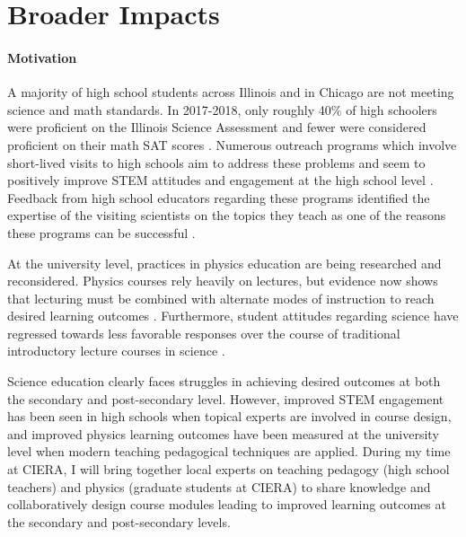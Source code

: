 \documentclass[11pt, preprint]{aastex}
\begin{document}
\vspace{-17pt}
\section{Broader Impacts}
\vspace{-6pt}
\label{sct:broader_impacts}

\paragraph{Motivation}
A majority of high school students across Illinois and in Chicago are not meeting science and math standards.
In 2017-2018, only roughly 40\% of high schoolers were proficient on the Illinois Science Assessment and fewer were considered proficient on their math SAT scores \citep{irc2018}.
Numerous outreach programs which involve short-lived visits to high schools aim to address these problems and seem to positively improve STEM attitudes and engagement at the high school level \citep{vennix&all2017, vennix&all2018}.
Feedback from high school educators regarding these programs identified the expertise of the visiting scientists on the topics they teach as one of the reasons these programs can be successful \citep{laursen&all2007}.

At the university level, practices in physics education are being researched and reconsidered.
Physics courses rely heavily on lectures, but evidence now shows that lecturing must be combined with alternate modes of instruction to reach desired learning outcomes \citep{meltzer&thornton2012}.
Furthermore, student attitudes regarding science have regressed towards less favorable responses over the course of traditional introductory lecture courses in science \citep{reddish&all1998}.

Science education clearly faces struggles in achieving desired outcomes at both the secondary and post-secondary level.
However, improved STEM engagement has been seen in high schools when topical experts are involved in course design, and improved physics learning outcomes have been measured at the university level when modern teaching pedagogical techniques are applied.
During my time at CIERA, I will bring together local experts on teaching pedagogy (high school teachers) and physics (graduate students at CIERA) to share knowledge and collaboratively design course modules leading to improved learning outcomes at the secondary and post-secondary levels.
\end{document}
